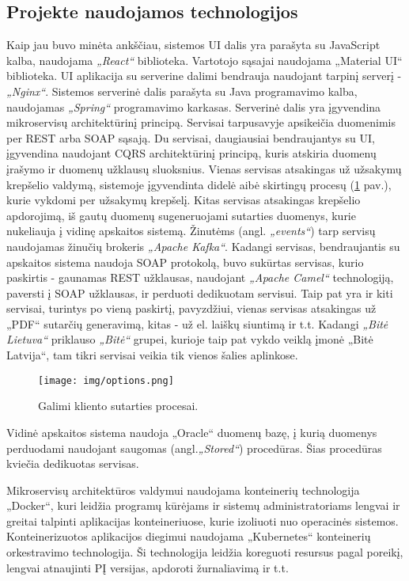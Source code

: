 \subsection{Projekte naudojamos technologijos}
Kaip jau buvo minėta ankščiau, sistemos UI dalis yra parašyta su JavaScript kalba, naudojama \textit{„React“} biblioteka. Vartotojo sąsajai naudojama „Material UI“ biblioteka.
UI aplikacija su serverine dalimi bendrauja naudojant tarpinį serverį - \textit{„Nginx“}.
Sistemos serverinė dalis parašyta su Java programavimo kalba, naudojamas \textit{„Spring“} programavimo karkasas. Serverinė dalis yra
įgyvendina mikroservisų architektūrinį principą. Servisai tarpusavyje apsikeičia duomenimis per
REST arba SOAP sąsają. Du servisai, daugiausiai bendraujantys su UI, įgyvendina naudojant CQRS architektūrinį principą,
kuris atskiria duomenų įrašymo ir duomenų užklausų sluoksnius. Vienas servisas atsakingas už užsakymų krepšelio valdymą, sistemoje įgyvendinta didelė
aibė skirtingų procesų (\ref{img:options} pav.),
kurie vykdomi per užsakymų krepšelį. Kitas servisas atsakingas krepšelio apdorojimą, iš gautų duomenų sugeneruojami sutarties duomenys, kurie nukeliauja į vidinę apskaitos sistemą.
Žinutėms (angl. \textit{„events“}) tarp servisų naudojamas žinučių brokeris \textit{„Apache Kafka“}. Kadangi servisas, bendraujantis su apskaitos sistema naudoja SOAP protokolą, buvo sukūrtas
servisas, kurio paskirtis - gaunamas REST užklausas, naudojant \textit{„Apache Camel“} technologiją, paversti į SOAP užklausas, ir perduoti dedikuotam servisui.
Taip pat yra ir kiti servisai, turintys po vieną paskirtį, pavyzdžiui, vienas servisas atsakingas už „PDF“ sutarčių generavimą, kitas - už el. laiškų siuntimą ir t.t.
Kadangi \textit{„Bitė Lietuva“} priklauso \textit{„Bitė“} grupei, kurioje taip pat vykdo veiklą įmonė „Bitė Latvija“, tam tikri servisai veikia tik vienos šalies aplinkose.

\begin{figure}[H]
    \centering
    \texttt{[image: img/options.png]}
    \caption{Galimi kliento sutarties procesai.}
    \label{img:options}
\end{figure}

Vidinė apskaitos sistema naudoja „Oracle“ duomenų bazę, į kurią duomenys perduodami naudojant saugomas (angl.\textit{„Stored“}) procedūras. Šias procedūras kviečia dedikuotas servisas.

Mikroservisų architektūros valdymui naudojama konteinerių technologija „Docker“, kuri leidžia programų kūrėjams ir sistemų administratoriams lengvai ir greitai
talpinti aplikacijas konteineriuose, kurie izoliuoti nuo operacinės sistemos. Konteinerizuotos aplikacijos diegimui naudojama „Kubernetes“ konteinerių orkestravimo technologija.
Ši technologija leidžia koreguoti resursus pagal poreikį, lengvai atnaujinti PĮ versijas, apdoroti žurnaliavimą ir t.t.